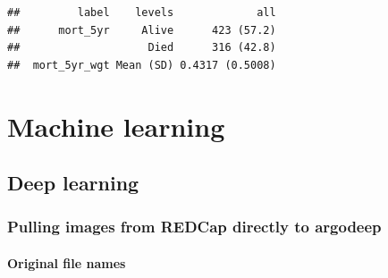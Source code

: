 \documentclass[
]{book}
\begin{document}
\begin{verbatim}
##         label    levels             all
##      mort_5yr     Alive      423 (57.2)
##                    Died      316 (42.8)
##  mort_5yr_wgt Mean (SD) 0.4317 (0.5008)
\end{verbatim}

\hypertarget{machine-learning}{%
\chapter{Machine learning}\label{machine-learning}}

\hypertarget{deep-learning}{%
\section{Deep learning}\label{deep-learning}}

\hypertarget{pulling-images-from-redcap-directly-to-argodeep}{%
\subsection{Pulling images from REDCap directly to argodeep}\label{pulling-images-from-redcap-directly-to-argodeep}}

\hypertarget{original-file-names}{%
\subsubsection{Original file names}\label{original-file-names}}
\end{document}
